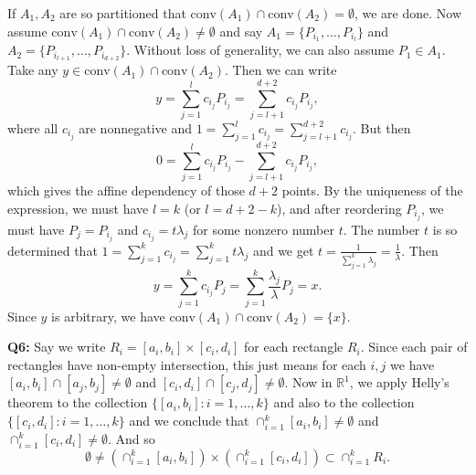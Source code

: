 \documentclass[12pt,reqno]{amsart}
\theoremstyle{definition}
\newcommand{\RR}{\mathbb{R}}
\newcommand{\conv}[1]{\mathrm{conv}(#1)}
\begin{document}
If $A_1, A_2$ are so partitioned that $\conv{A_1}\cap\conv{A_2}=\emptyset$, we are done. Now assume $\conv{A_1}\cap\conv{A_2}\not=\emptyset$ and say $A_1=\{P_{i_1},\dots,P_{i_l}\}$ and $A_2=\{P_{i_{l+1}},\dots,P_{i_{d+2}}\}$. Without loss of generality, we can also assume $P_1\in A_1$. Take any $y\in \conv{A_1}\cap\conv{A_2}$. Then we can write $$y = \sum_{j=1}^{l} c_{i_j} P_{i_j} =  \sum_{j=l+1}^{d+2} c_{i_j} P_{i_j},$$ where all $c_{i_j}$ are nonnegative and $1=\sum_{j=1}^{l} c_{i_j} =  \sum_{j=l+1}^{d+2} c_{i_j}$. But then $$0= \sum_{j=1}^{l} c_{i_j} P_{i_j} - \sum_{j=l+1}^{d+2} c_{i_j} P_{i_j},$$ which gives the affine dependency of those $d+2$ points. By the uniqueness of the expression, we must have $l=k$ (or $l=d+2-k$), and after reordering $P_{i_j}$, we must have $P_j=P_{i_j}$ and $c_{i_j} = t\lambda_j$ for some nonzero number $t$. The number $t$ is so determined that $1= \sum_{j=1}^{k} c_{i_j} =\sum_{j=1}^{k} t \lambda_j$ and we get $t=\frac{1}{\sum_{j=1}^{k}  \lambda_j} =\frac{1}{\lambda}$. Then $$y= \sum_{j=1}^{k} c_{i_j} P_j = \sum_{j=1}^{k} \frac{\lambda_j} {\lambda} P_{j}=x.$$ Since $y$ is arbitrary, we have $\conv{A_1}\cap\conv{A_2}=\{x\}$.

\newpage
\noindent \textbf{Q6:} Say we write $R_i=[a_i,b_i]\times [c_i, d_i]$ for each rectangle $R_i$. Since each pair of rectangles have non-empty intersection, this just means for each $i,j$ we have $[a_i,b_i]\cap [a_j,b_j]\not=\emptyset$ and $[c_i,d_i]\cap [c_j,d_j]\not=\emptyset$. Now in $\RR^1$, we apply Helly's theorem to the collection $\{[a_i,b_i]:i=1,\dots, k\}$ and also to the collection $\{[c_i,d_i]:i=1,\dots, k\}$ and we conclude that $\cap_{i=1}^k [a_i,b_i]\not=\emptyset$ and $\cap_{i=1}^k [c_i,d_i]\not=\emptyset$. And so
\[\emptyset\not= (\cap_{i=1}^k [a_i,b_i]) \times (\cap_{i=1}^k [c_i,d_i])\subset \cap_{i=1}^k R_i.\]
\end{document}
